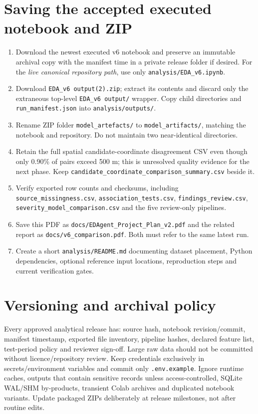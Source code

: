 \documentclass[11pt,a4paper,openany]{report}
\newcommand{\pathcode}[1]{\nolinkurl{#1}}
\begin{document}
\section{Saving the accepted executed notebook and ZIP}
\begin{enumerate}
\item Download the newest executed v6 notebook and preserve an immutable archival copy with the manifest time in a private release folder if desired. For the \emph{live canonical repository path}, use only \pathcode{analysis/EDA_v6.ipynb}.
\item Download \pathcode{EDA_v6 output(2).zip}; extract its contents and discard only the extraneous top-level \pathcode{EDA_v6 output/} wrapper. Copy child directories and \pathcode{run_manifest.json} into \pathcode{analysis/outputs/}.
\item Rename ZIP folder \pathcode{model_artefacts/} to \pathcode{model_artifacts/}, matching the notebook and repository. Do not maintain two near-identical directories.
\item Retain the full spatial candidate-coordinate disagreement CSV even though only 0.90\% of pairs exceed 500 m; this is unresolved quality evidence for the next phase. Keep \pathcode{candidate_coordinate_comparison_summary.csv} beside it.
\item Verify exported row counts and checksums, including \pathcode{source_missingness.csv}, \pathcode{association_tests.csv}, \pathcode{findings_review.csv}, \pathcode{severity_model_comparison.csv} and the five review-only pipelines.
\item Save this PDF as \pathcode{docs/EDAgent_Project_Plan_v2.pdf} and the related report as \pathcode{docs/v6_comparison.pdf}. Both must refer to the same latest run.
\item Create a short \pathcode{analysis/README.md} documenting dataset placement, Python dependencies, optional reference input locations, reproduction steps and current verification gates.
\end{enumerate}

\section{Versioning and archival policy}
Every approved analytical release has: source hash, notebook revision/commit, manifest timestamp, exported file inventory, pipeline hashes, declared feature list, test-period policy and reviewer sign-off. Large raw data should not be committed without licence/repository review. Keep credentials exclusively in secrets/environment variables and commit only \pathcode{.env.example}. Ignore runtime caches, outputs that contain sensitive records unless access-controlled, SQLite WAL/SHM by-products, transient Colab archives and duplicated notebook variants. Update packaged ZIPs deliberately at release milestones, not after routine edits.
\end{document}
